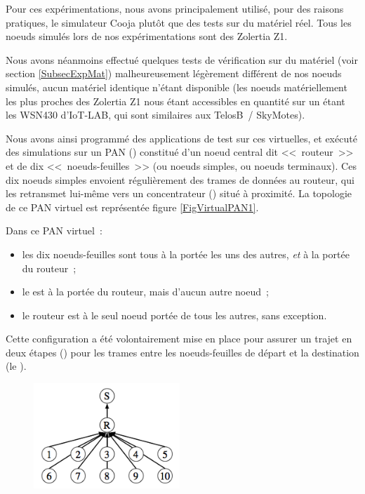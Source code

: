 Pour ces expérimentations, nous avons principalement utilisé, pour des
raisons pratiques, le simulateur Cooja plutôt que des tests sur du matériel
réel. Tous les noeuds simulés lors de nos expérimentations sont des
Zolertia Z1.

Nous avons néanmoins effectué quelques tests de vérification sur du matériel
(voir section \vref{SubsecExpMat}) malheureusement légèrement différent de
nos noeuds simulés, aucun matériel identique n'étant disponible (les
noeuds matériellement les plus proches des Zolertia Z1 nous étant
accessibles en quantité sur un  étant les WSN430 d'IoT-LAB,
qui sont similaires aux TelosB~/ SkyMotes).

Nous avons ainsi programmé des applications de test sur ces 
virtuelles, et exécuté des simulations sur un PAN () constitué d'un noeud central dit <<~routeur~>>
et de dix <<~noeuds-feuilles~>> (ou noeuds simples, ou noeuds terminaux).
Ces dix noeuds simples envoient régulièrement des trames de données au
routeur, qui les retransmet lui-même vers un concentrateur ()
situé à proximité. La topologie de ce PAN virtuel est représentée figure
\vref{FigVirtualPAN1}.

Dans ce PAN virtuel~:
\begin{itemize}
\item les dix noeuds-feuilles sont tous à la portée les uns des autres,
\emph{et} à la portée du routeur~;
\item le  est à la portée du routeur, mais d'aucun autre
noeud~;
\item le routeur est à le seul noeud portée de tous les autres,
sans exception.
\end{itemize}
Cette configuration a été volontairement mise en place pour assurer
un trajet en deux étapes () pour les trames
entre les noeuds-feuilles de départ et la destination (le ).

\begin{figure}[!hbt]
\centering
\includegraphics[width=5.5cm]{images/ch5-virtual-pan-test-1.png}
\label{FigVirtualPAN1}
\end{figure}


